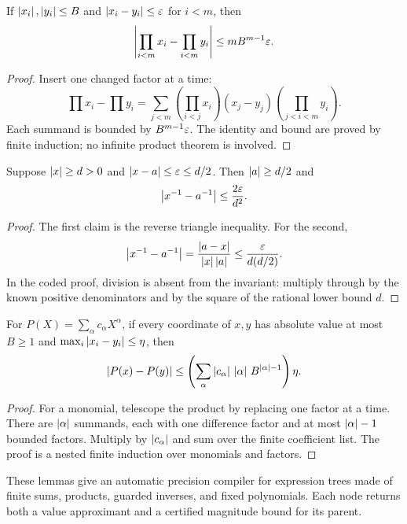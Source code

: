 \begin{lemma}[Products]
\label{lem:product-error}
If \(\left|x_i\right|,\left|y_i\right|\le B\) and
\(\left|x_i-y_i\right|\le\varepsilon\) for \(i<m\), then
\[
 \left|\prod_{i<m}x_i-\prod_{i<m}y_i\right|
 \le m B^{m-1}\varepsilon.
\]
\end{lemma}

\begin{proof}
Insert one changed factor at a time:
\[
 \prod x_i-\prod y_i=
 \sum_{j<m}\left(\prod_{i<j}x_i\right)(x_j-y_j)
                 \left(\prod_{j<i<m}y_i\right).
\]
Each summand is bounded by \(B^{m-1}\varepsilon\).  The identity and bound are
proved by finite induction; no infinite product theorem is involved.
\end{proof}

\begin{lemma}
\label{lem:reciprocal}
Suppose \(\left|x\right|\ge d>0\) and \(\left|x-a\right|\le\varepsilon\le d/2\).  Then
\(\left|a\right|\ge d/2\) and
\[
 \left|x^{-1}-a^{-1}\right|\le \frac{2\varepsilon}{d^2}.
\]
\end{lemma}

\begin{proof}
The first claim is the reverse triangle inequality.  For the second,
\[
 \left|x^{-1}-a^{-1}\right|=\frac{\left|a-x\right|}{\left|x\right|\left|a\right|}
 \le \frac{\varepsilon}{d(d/2)}.
\]
In the coded proof, division is absent from the invariant: multiply through by
the known positive denominators and by the square of the rational lower bound \(d\).
\end{proof}

\begin{lemma}
\label{lem:poly-lip}
For \(P(X)=\sum_\alpha c_\alpha X^\alpha\), if every coordinate of \(x,y\)
has absolute value at most \(B\ge1\) and
\(\max_i\left|x_i-y_i\right|\le\eta\), then
\[
 \left|P(x)-P(y)\right|\le
 \left(\sum_\alpha\left|c_\alpha\right|\,\left|\alpha\right|\,B^{\left|\alpha\right|-1}\right)\eta.
\]
\end{lemma}

\begin{proof}
For a monomial, telescope the product by replacing one factor at a time.
There are \(\left|\alpha\right|\) summands, each with one difference factor and at
most \(\left|\alpha\right|-1\) bounded factors.  Multiply by
\(\left|c_\alpha\right|\) and sum over the finite coefficient list.  The proof is a
nested finite induction over monomials and factors.
\end{proof}

These lemmas give an automatic precision compiler for expression trees made of
finite sums, products, guarded inverses, and fixed polynomials.  Each node
returns both a value approximant and a certified magnitude bound for its
parent.

